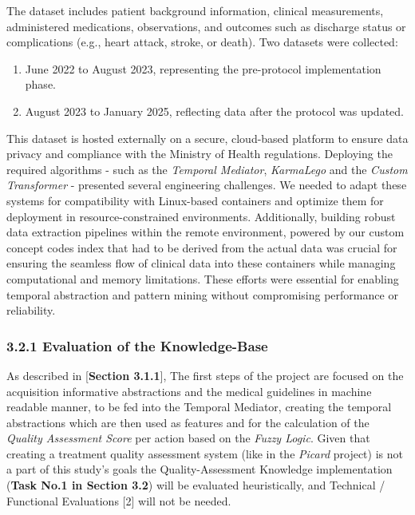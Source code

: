 \documentclass[
]{article}
\begin{document}
The dataset includes patient background information, clinical
measurements, administered medications, observations, and outcomes such
as discharge status or complications (e.g., heart attack, stroke, or
death). Two datasets were collected:

\begin{enumerate}
\def\labelenumi{\arabic{enumi}.}
\item
  June 2022 to August 2023, representing the pre-protocol implementation
  phase.
\item
  August 2023 to January 2025, reflecting data after the protocol was
  updated.
\end{enumerate}

This dataset is hosted externally on a secure, cloud-based platform to
ensure data privacy and compliance with the Ministry of Health
regulations. Deploying the required algorithms - such as the
\emph{Temporal Mediator}, \emph{KarmaLego} and the \emph{Custom
Transformer} - presented several engineering challenges. We needed to
adapt these systems for compatibility with Linux-based containers and
optimize them for deployment in resource-constrained environments.
Additionally, building robust data extraction pipelines within the
remote environment, powered by our custom concept codes index that had
to be derived from the actual data was crucial for ensuring the seamless
flow of clinical data into these containers while managing computational
and memory limitations. These efforts were essential for enabling
temporal abstraction and pattern mining without compromising performance
or reliability.

\subsubsection{3.2.1 Evaluation of the
Knowledge-Base}\label{evaluation-of-the-knowledge-base}

As described in {[}\textbf{Section 3.1.1}{]}, The first steps of the
project are focused on the acquisition informative abstractions and the
medical guidelines in machine readable manner, to be fed into the
Temporal Mediator, creating the temporal abstractions which are then
used as features and for the calculation of the \emph{Quality Assessment
Score} per action based on the \emph{Fuzzy Logic}. Given that creating a
treatment quality assessment system (like in the \emph{Picard} project)
is not a part of this study's goals the Quality-Assessment Knowledge
implementation (\textbf{Task No.1 in Section 3.2}) will be evaluated
heuristically, and Technical / Functional Evaluations {[}2{]} will not
be needed.
\end{document}
